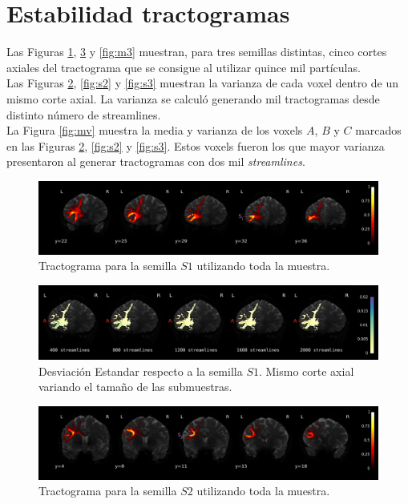 \section{Estabilidad tractogramas}

Las Figuras \ref{fig:m1}, \ref{fig:m2} y \ref{fig:m3} muestran, para tres semillas
distintas, cinco cortes axiales del tractograma que se consigue al utilizar quince
mil part\'iculas.\\

Las Figuras \ref{fig:s1}, \ref{fig:s2} y \ref{fig:s3} muestran la varianza de 
cada voxel dentro de un mismo corte axial. La varianza se calcul\'o generando
mil tractogramas desde distinto n\'umero de streamlines. \\

La Figura \ref{fig:mv} muestra la media y varianza de los voxels $A$, $B$ y $C$
marcados en las Figuras \ref{fig:s1}, \ref{fig:s2} y \ref{fig:s3}. Estos voxels
fueron los que mayor varianza presentaron al generar tractogramas con dos mil
\textit{streamlines}.


\begin{figure}[h!]
   \centering
    \includegraphics[width=\textwidth]{img/m1.png}
    \caption{Tractograma para la semilla $S1$ utilizando toda la muestra.}
    \label{fig:m1}
\end{figure}

\begin{figure}[h!]
   \centering
    \includegraphics[width=\textwidth]{img/s1.png}
    \caption{Desviaci\'on Estandar respecto a la semilla $S1$. Mismo corte axial
             variando el tama\~no de las submuestras.}
    \label{fig:s1}
\end{figure}

\begin{figure}[h!]
   \centering
    \includegraphics[width=\textwidth]{img/m2.png}
    \caption{Tractograma para la semilla $S2$ utilizando toda la muestra.}
    \label{fig:m2}
\end{figure}

